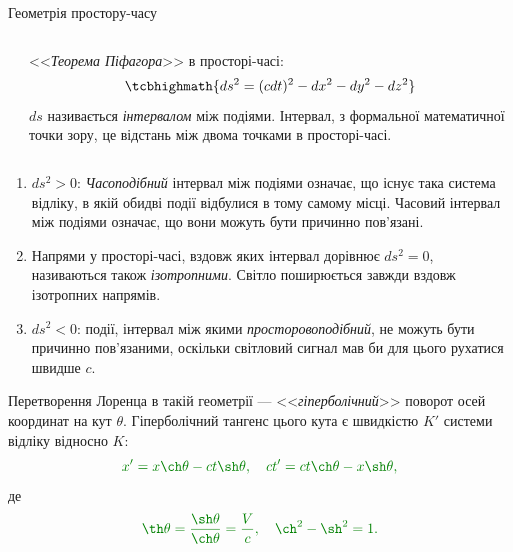 \documentclass[]{beamer}
\begin{document}
\begin{frame}{Геометрія простору-часу}{}
\begin{columns}
\begin{column}{0.4\linewidth}
\begin{pict}
			\end{pict}
		\end{column}
		\begin{column}{0.6\linewidth}
			\begin{block}{}\justifying
				<<\emph{\color{blue}Теорема Піфагора}>> в просторі-часі:
				\begin{equation*}%
					\tcbhighmath{
						ds^2 = (cdt)^2 - dx^2 - dy^2 - dz^2
					}
				\end{equation*}
				{\color{blue} $ ds $} називається \emph{\color{blue}інтервалом} між подіями. Інтервал, з формальної математичної точки зору, це відстань між
				двома точками в просторі-часі.
			\end{block}
		\end{column}
	\end{columns}
	\begin{overprint}
		\begin{enumerate}\small\justifying
			\item $ds^2 > 0$: \emph{\color{blue}Часоподібний} інтервал між подіями означає, що існує така система відліку, в якій обидві події
			      відбулися в тому самому місці. Часовий інтервал між подіями означає, що вони можуть бути причинно пов'язані.
			\item Напрями у просторі-часі, вздовж яких інтервал дорівнює $ds^2 = 0$, називаються також \emph{\color{blue}ізотропними}. Світло
			      поширюється завжди вздовж ізотропних напрямів.
			\item $ds^2  < 0$: події, інтервал між якими \emph{\color{blue}просторовоподібний}, не можуть бути причинно
			      пов'язаними, оскільки світловий сигнал мав би для цього рухатися швидше $c$.
		\end{enumerate}
		Перетворення Лоренца в такій геометрії --- <<\emph{\color{blue}гіперболічний}>> поворот осей координат на кут $ \theta $. Гіперболічний тангенс цього кута є швидкістю $ K' $ системи відліку відносно $ K $:
		\begin{equation*}\color{green!50!black}
			x' = x\ch\theta - ct\sh\theta, \quad ct' = ct\ch\theta - x \sh\theta ,
		\end{equation*}
		де
		\begin{equation*}\color{green!50!black}
			\th\theta = \frac{\sh\theta}{\ch\theta} = \frac{V}{c}, \quad \ch^2 - \sh^2 = 1.
		\end{equation*}


\end{overprint}
\end{frame}
\end{document}
